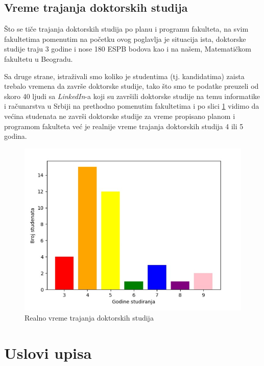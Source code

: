 \documentclass[a4paper]{article}
\begin{document}
\subsection{Vreme trajanja doktorskih studija}

Što se tiče trajanja doktorskih studija po planu i programu fakulteta, na svim fakultetima pomenutim na početku ovog poglavlja je situacija ista, doktorske studije traju 3 godine i nose 180 ESPB bodova kao i na našem, Matematičkom fakultetu u Beogradu\cite{matfbgdoktorske}.


Sa druge strane, istraživali smo koliko je studentima (tj. kandidatima) zaista trebalo vremena da završe doktorske studije, tako što smo te podatke preuzeli od skoro 40 ljudi sa \emph{LinkedIn}-a koji su završili doktorske studije na temu informatike i računarstva u Srbiji na prethodno pomenutim fakultetima i po slici \ref{fig:statistics-bar} vidimo da većina studenata ne završi doktorske studije za vreme propisano planom i programom fakulteta već je realnije vreme trajanja doktorskih studija 4 ili 5 godina. 

\begin{figure}[h!]
\begin{center}
\includegraphics[scale=0.4]{DuzinaStudija.png}
\end{center}
\caption{Realno vreme trajanja doktorskih studija}
\label{fig:statistics-bar}
\end{figure}

\section{Uslovi upisa}
\label{sec:uslovi}
\end{document}

